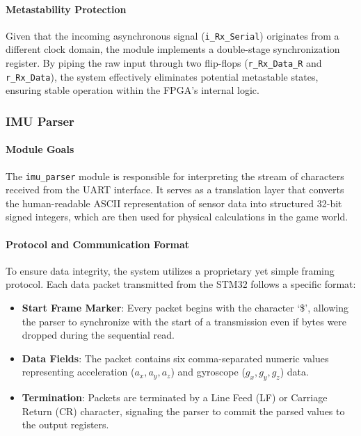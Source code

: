 \documentclass[12pt,a4paper]{article}
\begin{document}
\paragraph{Metastability Protection}
Given that the incoming asynchronous signal (\texttt{i\_Rx\_Serial}) originates from a different clock domain, the module implements a double-stage synchronization register. By piping the raw input through two flip-flops (\texttt{r\_Rx\_Data\_R} and \texttt{r\_Rx\_Data}), the system effectively eliminates potential metastable states, ensuring stable operation within the FPGA's internal logic.

\subsubsection{IMU Parser}

\paragraph{Module Goals}
The \texttt{imu\_parser} module is responsible for interpreting the stream of characters received from the UART interface. It serves as a translation layer that converts the human-readable ASCII representation of sensor data into structured 32-bit signed integers, which are then used for physical calculations in the game world.

\paragraph{Protocol and Communication Format}
To ensure data integrity, the system utilizes a proprietary yet simple framing protocol. Each data packet transmitted from the STM32 follows a specific format:
\begin{itemize}
    \item \textbf{Start Frame Marker}: Every packet begins with the character `\$', allowing the parser to synchronize with the start of a transmission even if bytes were dropped during the sequential read.
    \item \textbf{Data Fields}: The packet contains six comma-separated numeric values representing acceleration ($a_x, a_y, a_z$) and gyroscope ($g_x, g_y, g_z$) data.
    \item \textbf{Termination}: Packets are terminated by a Line Feed (LF) or Carriage Return (CR) character, signaling the parser to commit the parsed values to the output registers.
\end{itemize}
\end{document}
